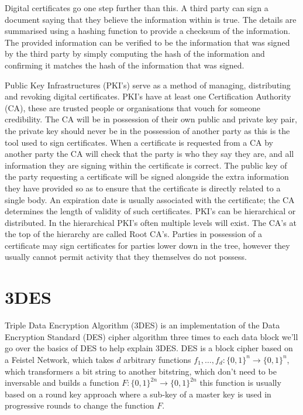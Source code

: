 \documentclass[12pt]{article}
\begin{document}
Digital certificates go one step further than this. A third party can sign a document saying that they believe the information within is true. The details are summarised using a hashing function to provide a checksum of the information. The provided information can be verified to be the information that was signed by the third party by simply computing the hash of the information and confirming it matches the hash of the information that was signed.

Public Key Infrastructures (PKI's) serve as a method of managing, distributing and revoking digital certificates. PKI's have at least one Certification Authority (CA), these are trusted people or organisations that vouch for someone credibility. The CA will be in possession of their own public and private key pair, the private key should never be in the possession of another party as this is the tool used to sign certificates. When a certificate is requested from a CA by another party the CA will check that the party is who they say they are, and all information they are signing within the certificate is correct. The public key of the party requesting a certificate will be signed alongside the extra information they have provided so as to ensure that the certificate is directly related to a single body. An expiration date is usually associated with the certificate; the CA determines the length of validity of such certificates. PKI's can be hierarchical or distributed. In the hierarchical PKI's often multiple levels will exist. The CA's at the top of the hierarchy are called Root CA's. Parties in possession of a certificate may sign certificates for parties lower down in the tree, however they usually cannot permit activity that they themselves do not possess.

\section{3DES}
\label{sec:3DES}
Triple Data Encryption Algorithm (3DES) is an implementation of the Data Encryption Standard (DES) cipher algorithm three times to each data block we'll go over the basics of DES to help explain 3DES. DES is a block cipher based on a Feistel Network, which takes $d$ arbitrary functions $f_1, \ldots , f_d: \{0,1\}^n \rightarrow \{0,1\}^n$, which transformers a bit string to another bitstring, which don't need to be inversable and builds a function $F:\{0,1\}^{2n} \rightarrow \{0,1\}^{2n}$ this function is usually based on a round key approach where a sub-key of a master key is used in progressive rounds to change the function $F$.
\end{document}
